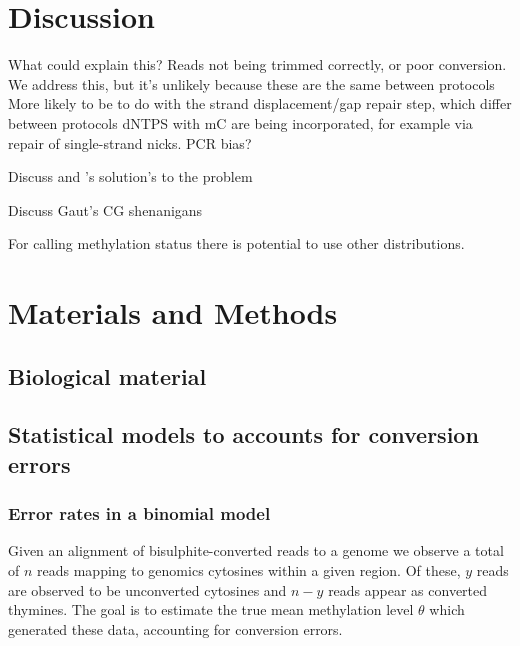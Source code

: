 \documentclass[12pt,longbibliography]{article}
\begin{document}
\section{Discussion}


What could explain this?
Reads not being trimmed correctly, or poor conversion.
We address this, but it's unlikely because these are the same between protocols
More likely to be to do with the strand displacement/gap repair step, which differ between protocols
dNTPS with mC are being incorporated, for example via repair of single-strand nicks.
PCR bias?

Discuss \cite{lu2015improved} and \cite{suzuki2018whole}'s solution's to the problem

Discuss Gaut's CG shenanigans

For calling methylation status there is potential to use other distributions.

\section{Materials and Methods}

\subsection{Biological material}

\subsection{Statistical models to accounts for conversion errors}

\subsubsection{Error rates in a binomial model} \label{sec:binomial-with-errors}

Given an alignment of bisulphite-converted reads to a genome we observe a total of $n$ reads mapping to genomics cytosines within a given region. Of these, $y$ reads are observed to be unconverted cytosines and $n-y$ reads appear as converted thymines. The goal is to estimate the true mean methylation level $\theta$ which generated these data, accounting for conversion errors.
\end{document}
